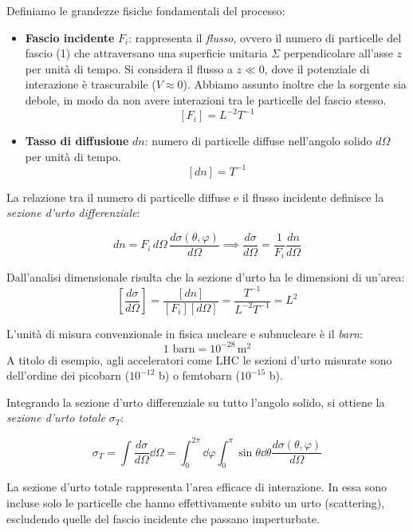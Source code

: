 Definiamo le grandezze fisiche fondamentali del processo:

\begin{itemize}
    \item \textbf{Fascio incidente} \( F_i \): rappresenta il \textit{flusso}, ovvero il numero di particelle del fascio (1) che attraversano una superficie unitaria \( \Sigma \) perpendicolare all'asse \( z \) per unità di tempo.
    Si considera il flusso a \( z \ll 0 \), dove il potenziale di interazione è trascurabile (\( V \approx 0 \)). Abbiamo assunto inoltre che la sorgente sia debole, in modo da non avere interazioni tra le particelle del fascio stesso.
    \[
        [F_i] = L^{-2} T^{-1}
    \]
    
    \item \textbf{Tasso di diffusione} \( dn \): numero di particelle diffuse nell'angolo solido \( d\Omega \) per unità di tempo.
    \[
        [dn] = T^{-1}
    \]
\end{itemize}

La relazione tra il numero di particelle diffuse e il flusso incidente definisce la \textit{sezione d'urto differenziale}:

\begin{equation}
    dn = F_i \, d\Omega \, \frac{d\sigma(\theta, \varphi)}{d\Omega} \implies \frac{d\sigma}{d\Omega} = \frac{1}{F_i} \frac{dn}{d\Omega}
\end{equation}

Dall'analisi dimensionale risulta che la sezione d'urto ha le dimensioni di un'area:
\[
    \left[ \frac{d\sigma}{d\Omega} \right] = \frac{[dn]}{[F_i] [d\Omega]} = \frac{T^{-1}}{L^{-2} T^{-1}} = L^2
\]

L'unità di misura convenzionale in fisica nucleare e subnucleare è il \textit{barn}:
\[
    1 \text{ barn} = 10^{-28} \, \text{m}^2
\]
A titolo di esempio, agli acceleratori come LHC le sezioni d'urto misurate sono dell'ordine dei picobarn (\( 10^{-12} \) b) o femtobarn (\( 10^{-15} \) b).

Integrando la sezione d'urto differenziale su tutto l'angolo solido, si ottiene la \textit{sezione d'urto totale} \( \sigma_T \):

\begin{equation}
    \sigma_T = \int \frac{d\sigma}{d\Omega} \dd{\Omega} = \int_0^{2\pi} \dd{\varphi} \int_0^\pi \sin\theta \dd{\theta} \frac{d\sigma(\theta, \varphi)}{d\Omega}
\end{equation}

\begin{remark}
    La sezione d'urto totale rappresenta l'area efficace di interazione. In essa sono incluse solo le particelle che hanno effettivamente subito un urto (scattering), escludendo quelle del fascio incidente che passano imperturbate.
\end{remark}


